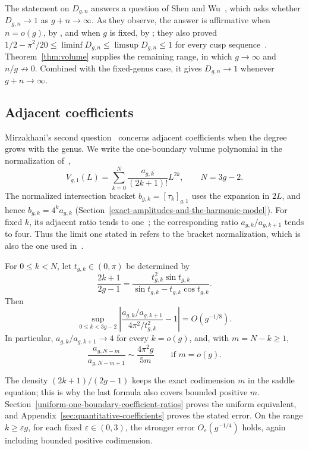 The statement on $D_{g,n}$ answers a question of Shen and Wu~\cite[Question~3]{SW}, which asks whether $D_{g,n}\to1$ as $g+n\to\infty$. As they observe, the answer is affirmative when $n=o(g)$, by \cite[Lemma~5.1]{MZ}, and when $g$ is fixed, by \cite[Theorem~6.1]{ManZ}; they also proved $1/2-\pi^2/20\le\liminf D_{g,n}\le\limsup D_{g,n}\le1$ for every cusp sequence~\cite[Proposition~36]{SW}. Theorem~\ref{thm:volume} supplies the remaining range, in which $g\to\infty$ and $n/g\not\to0$. Combined with the fixed-genus case, it gives $D_{g,n}\to1$ whenever $g+n\to\infty$.

\subsection{Adjacent coefficients}
Mirzakhani's second question~\cite[Section~1.4]{Mir} concerns adjacent coefficients when the degree grows with the genus. We write the one-boundary volume polynomial in the normalization of~\cite{Mir},
\[
 V_{g,1}(L)=\sum_{k=0}^{N}\frac{a_{g,k}}{(2k+1)!}L^{2k},
 \qquad N=3g-2.
\]
The normalized intersection bracket $b_{g,k}=[\tau_k]_{g,1}$ uses the expansion in $2L$, and hence $b_{g,k}=4^k a_{g,k}$ (Section~\ref{exact-amplitudes-and-the-harmonic-model}). For fixed $k$, its adjacent ratio tends to one~\cite[Theorem 3.5]{Mir}; the corresponding ratio $a_{g,k}/a_{g,k+1}$ tends to four. Thus the limit one stated in \cite[Section~1.4]{Mir} refers to the bracket normalization, which is also the one used in~\cite{LX}.

\begin{mainresult}
\begin{theorem}\label{thm:coefficient}
For $0\le k<N$, let $t_{g,k}\in(0,\pi)$ be determined by
\[
 \frac{2k+1}{2g-1}
 =\frac{t_{g,k}^{2}\sin t_{g,k}}
 {\sin t_{g,k}-t_{g,k}\cos t_{g,k}}.
\]
Then
\[
 \sup_{0\le k<3g-2}
 \left|\frac{a_{g,k}/a_{g,k+1}}{4\pi^2/t_{g,k}^{2}}-1\right|
 =O(g^{-1/8}).
\]
In particular, $a_{g,k}/a_{g,k+1}\to4$ for every $k=o(g)$, and, with $m=N-k\ge1$,
\[
 \frac{a_{g,N-m}}{a_{g,N-m+1}}
 \sim\frac{4\pi^2g}{5m}\qquad\text{if }m=o(g).
\]
\end{theorem}
\end{mainresult}
The density $(2k+1)/(2g-1)$ keeps the exact codimension $m$ in the saddle equation; this is why the last formula also covers bounded positive $m$. Section~\ref{uniform-one-boundary-coefficient-ratios} proves the uniform equivalent, and Appendix~\ref{sec:quantitative-coefficients} proves the stated error. On the range $k\ge\varepsilon g$, for each fixed $\varepsilon\in(0,3)$, the stronger error $O_\varepsilon(g^{-1/4})$ holds, again including bounded positive codimension.

